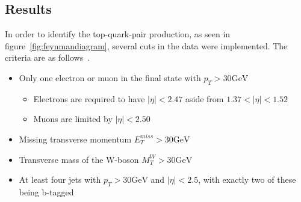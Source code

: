 \documentclass[12pt,a4paper]{article}
\numberwithin{equation}{section}
\begin{document}
\subsection{Results}\label{sec:results}
In order to identify the top-quark-pair production, as seen in
figure~\ref{fig:feynmandiagram}, several cuts in the data were implemented. The
criteria are as follows~\cite{oreach2020}.
\begin{itemize}
  \item Only one electron or muon in the final state with $p_{T} > 30 \mathrm{GeV}$
  \begin{itemize}
    \item Electrons are required to have $|\eta| < 2.47$ aside from $1.37 < |\eta| < 1.52$
    \item Muons are limited by $|\eta| < 2.50$
  \end{itemize}
  \item Missing transverse momentum $E_{T}^{miss} > 30 \mathrm{GeV}$
  \item Transverse mass of the W-boson $M_{T}^{W} > 30 \mathrm{GeV}$
  \item At least four jets with $p_{T} > 30 \mathrm{GeV}$ and $|\eta| < 2.5$, with
        exactly two of these being b-tagged
\end{itemize}

\end{document}
